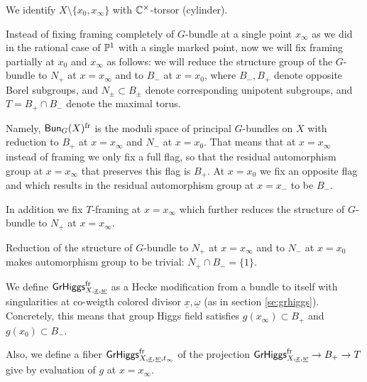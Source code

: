 \documentclass[12pt,psamsfonts,reqno]{amsart}
\begin{document}
We identify $X \setminus \{x_0, x_\infty\}$ with $\mathbb C^{\times}$-torsor (cylinder). 

Instead of fixing framing completely of $G$-bundle at a single point $x_\infty$ as we did in the rational case of $\mathbb P^{1}$ with a single marked point,
now we will fix framing partially at $x_0$ and $x_\infty$ as follows: we will reduce the structure group of the $G$-bundle to $N_{+}$ at $x=x_{\infty}$ and to
$B_{-}$ at $x = x_0$, where $B_{-}, B_{+}$ denote opposite Borel subgroups, and $N_{\pm} \subset B_{\pm}$ denote corresponding unipotent subgroups, and
$T= B_{+} \cap B_{-}$ denote the maximal torus. 



Namely, $\mathsf{Bun}_{G}(X)^{\mathrm{fr}}$ is the moduli space of principal $G$-bundles on $X$ with reduction to $B_{+}$ at $x=x_\infty$ and $N_{-}$ at $x = x_{0}$.
That means that at $x=x_{\infty}$ instead of framing we only fix a full flag, so that the residual
automorphism group at $x = x_\infty$ that preserves this flag is $B_{+}$. At $x = x_{0}$ we fix an opposite flag and which results in the residual automorphism
group at $x = x_{-}$ to be $B_{-}$.

In addition we fix $T$-framing at $x = x_\infty$ which further reduces the structure of $G$-bundle to $N_{+}$ at $x = x_\infty$. 

Reduction of the structure of $G$-bundle to $N_{+}$ at $x = x_\infty$ and to $N_{-}$ at $x = x_{0}$ makes automorphism group to be trivial: $N_{+} \cap B_{-} = \{1 \}$. 

We define $\mathsf{GrHiggs}_{X,\underline{x}, \underline{w}}^{\mathrm{fr}}$ as a Hecke modification from a bundle to itself with
  singularities at co-weigth colored divisor $\underline{x}, \underline{\omega}$ (as in section \ref{se:grhiggs}). Concretely, this means
  that group Higgs field satisfies
  $g(x_\infty) \subset B_{+}$ and $g(x_0) \subset B_{-}$. 


  Also, we define a fiber $\mathsf{GrHiggs}_{X,\underline{x}, \underline{w},t_\infty}^{\mathrm{fr}}$
  of the projection $\mathsf{GrHiggs}_{X,\underline{x}, \underline{w}}^{\mathrm{fr}} \to B_{+} \to T$
  give by evaluation of $g$ at $x = x_\infty$.
\end{document}
